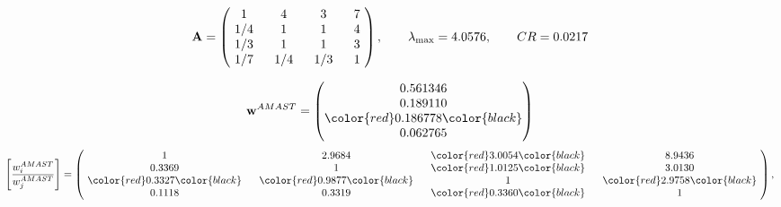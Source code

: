 \begin{example}
\begin{equation*}
\mathbf{A} =
\begin{pmatrix}
$\,\,$ 1 $\,\,$ & $\,\,$4$\,\,$ & $\,\,$3$\,\,$ & $\,\,$7 $\,\,$ \\
$\,\,$ 1/4$\,\,$ & $\,\,$ 1 $\,\,$ & $\,\,$1$\,\,$ & $\,\,$4 $\,\,$ \\
$\,\,$ 1/3$\,\,$ & $\,\,$ 1 $\,\,$ & $\,\,$ 1 $\,\,$ & $\,\,$3 $\,\,$ \\
$\,\,$ 1/7$\,\,$ & $\,\,$ 1/4$\,\,$ & $\,\,$ 1/3$\,\,$ & $\,\,$ 1  $\,\,$ \\
\end{pmatrix},
\qquad
\lambda_{\max} =
4.0576,
\qquad
CR = 0.0217
\end{equation*}

\begin{equation*}
\mathbf{w}^{AMAST} =
\begin{pmatrix}
0.561346\\
0.189110\\
\color{red} 0.186778\color{black} \\
0.062765
\end{pmatrix}\end{equation*}
\begin{equation*}
\left[ \frac{{w}^{AMAST}_i}{{w}^{AMAST}_j} \right] =
\begin{pmatrix}
$\,\,$ 1 $\,\,$ & $\,\,$2.9684$\,\,$ & $\,\,$\color{red} 3.0054\color{black} $\,\,$ & $\,\,$8.9436$\,\,$ \\
$\,\,$0.3369$\,\,$ & $\,\,$ 1 $\,\,$ & $\,\,$\color{red} 1.0125\color{black} $\,\,$ & $\,\,$3.0130  $\,\,$ \\
$\,\,$\color{red} 0.3327\color{black} $\,\,$ & $\,\,$\color{red} 0.9877\color{black} $\,\,$ & $\,\,$ 1 $\,\,$ & $\,\,$\color{red} 2.9758\color{black}  $\,\,$ \\
$\,\,$0.1118$\,\,$ & $\,\,$0.3319$\,\,$ & $\,\,$\color{red} 0.3360\color{black} $\,\,$ & $\,\,$ 1  $\,\,$ \\
\end{pmatrix},
\end{equation*}


\end{example}

